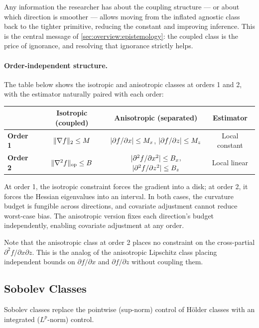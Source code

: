 Any information the researcher has about the coupling structure --- or about which direction is smoother --- allows moving from the inflated agnostic class back to the tighter primitive, reducing the constant and improving inference.
This is the central message of \cref{sec:overview:epistemology}: the coupled class is the price of ignorance, and resolving that ignorance strictly helps.

\paragraph{Order-independent structure.}
The table below shows the isotropic and anisotropic classes at orders 1 and 2, with the estimator naturally paired with each order:
\begin{center}
\begin{tabular}{lccc}
	\toprule
	& \textbf{Isotropic (coupled)} & \textbf{Anisotropic (separated)} & \textbf{Estimator} \\
	\midrule
	\textbf{Order 1} & $\lVert\nabla f\rVert_2 \leq M$ & $\lvert\partial f / \partial x\rvert \leq M_x$, $\lvert\partial f / \partial z\rvert \leq M_z$ & Local constant \\
	\textbf{Order 2} & $\lVert\nabla^2 f\rVert_{\mathrm{op}} \leq B$ & $\lvert\partial^2 f / \partial x^2\rvert \leq B_x$, $\lvert\partial^2 f / \partial z^2\rvert \leq B_z$ & Local linear \\
	\bottomrule
\end{tabular}
\end{center}
At order 1, the isotropic constraint forces the gradient into a disk; at order 2, it forces the Hessian eigenvalues into an interval.
In both cases, the curvature budget is fungible across directions, and covariate adjustment cannot reduce worst-case bias.
The anisotropic version fixes each direction's budget independently, enabling covariate adjustment at any order.

Note that the anisotropic class at order 2 places no constraint on the cross-partial $\partial^2 f / \partial x \partial z$.
This is the analog of the anisotropic Lipschitz class placing independent bounds on $\partial f / \partial x$ and $\partial f / \partial z$ without coupling them.


\subsection{Sobolev Classes}\label{sec:appendix:sobolev}

Sobolev classes replace the pointwise (sup-norm) control of Hölder classes with an integrated ($L^p$-norm) control.

